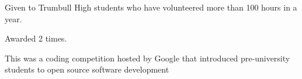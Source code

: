 \documentclass[]{resume-template}
\begin{document}
\begin{minipage}[t]{0.66\textwidth}
\begin{tightemize}
\item Given to Trumbull High students who have volunteered more than 100 hours in a year.
\item Awarded 2 times.
\end{tightemize}
\sectionsep{}

\begin{tightemize}
\item This was a coding competition hosted by Google that introduced pre-university students to open source software development
\end{tightemize}
\sectionsep{}





\end{minipage} 
\end{document}
